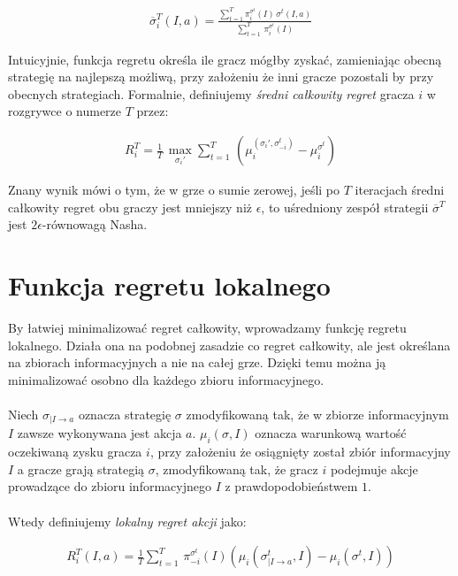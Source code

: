 \documentclass[magisterska]{pracamgr}
\begin{document}
\begin{align*}
\overline{\sigma}_i^T(I, a) = \frac{\sum\limits_{t=1}^T \pi_i^{\sigma^t}(I) \, \sigma^t(I, a)}{\sum\limits_{t=1}^T \, \pi_i^{\sigma^t}(I)}
\end{align*}

\noindent
Intuicyjnie, funkcja regretu określa ile gracz mógłby zyskać, zamieniając obecną strategię na najlepszą możliwą,
przy założeniu że inni gracze pozostali by przy obecnych strategiach. Formalnie, definiujemy \emph{średni całkowity regret} gracza $i$
w rozgrywce o numerze $T$ przez:

\begin{align*}
R_i^T = \frac{1}{T} \, \max_{\sigma_i'} \sum\limits_{t=1}^T \, (\mu_i^{(\sigma_i', \sigma_{-i}^t)} - \mu_i^{\sigma^t})
\end{align*}

\noindent
Znany wynik \cite{cfr} mówi o tym, że w grze o sumie zerowej, jeśli po $T$ iteracjach średni całkowity regret obu graczy
jest mniejszy niż $\epsilon$, to uśredniony zespół strategii $\overline{\sigma}^T$ jest $2\epsilon$-równowagą Nasha.

\section{Funkcja regretu lokalnego}

By łatwiej minimalizować regret całkowity, wprowadzamy funkcję regretu lokalnego.
Działa ona na podobnej zasadzie co regret całkowity, ale jest określana na zbiorach informacyjnych
a nie na całej grze. Dzięki temu można ją minimalizować osobno dla każdego zbioru informacyjnego. \\\\

\noindent
Niech $\sigma_{|I \rightarrow a}$ oznacza strategię $\sigma$ zmodyfikowaną tak, że w zbiorze informacyjnym $I$ zawsze
wykonywana jest akcja $a$. $\mu_i(\sigma, I)$ oznacza warunkową wartość oczekiwaną zysku gracza $i$, przy założeniu że
osiągnięty został zbiór informacyjny $I$ a gracze grają strategią $\sigma$, zmodyfikowaną tak, że gracz $i$
podejmuje akcje prowadzące do zbioru informacyjnego $I$ z prawdopodobieństwem $1$. \\\\

\noindent
Wtedy definiujemy \emph{lokalny regret akcji} jako:

\begin{align*}
R_i^T(I, a) = \frac{1}{T} \sum\limits_{t=1}^{T} \, \pi_{-i}^{\sigma^t}(I)(\mu_i(\sigma^t_{|I \rightarrow a}, I) - \mu_i(\sigma^t, I))
\end{align*}
\end{document}
